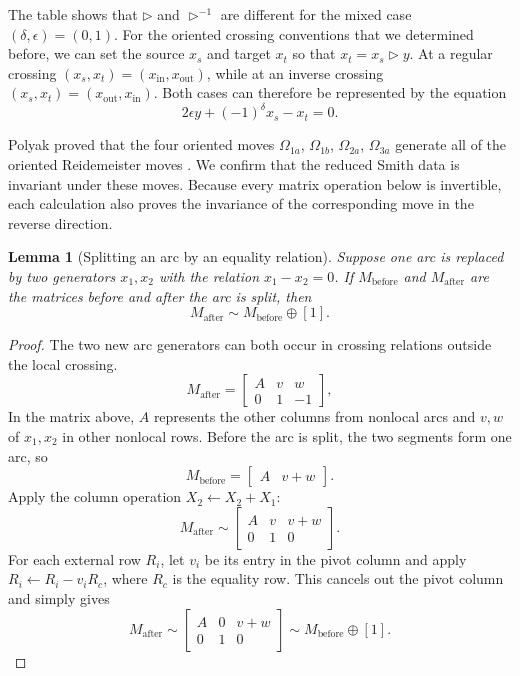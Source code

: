 \documentclass[11pt]{article}
\newtheorem{lemma}[theorem]{Lemma}
\theoremstyle{definition}
\begin{document}
The table shows that $\triangleright$ and $\triangleright^{-1}$ are different for the mixed case $(\delta,\epsilon)=(0,1)$. For the oriented crossing conventions that we determined before, we can set the source $x_s$ and target $x_t$ so that $x_t=x_s\triangleright y$. At a regular crossing $(x_s,x_t)=(x_{\mathrm{in}},x_{\mathrm{out}})$, while at an inverse crossing $(x_s,x_t)=(x_{\mathrm{out}},x_{\mathrm{in}})$. Both cases can therefore be represented by the equation
\begin{equation}
2\epsilon y+(-1)^\delta x_s-x_t=0.
\label{eq:oriented-crossing}
\end{equation}

Polyak proved that the four oriented moves $\Omega_{1a}$, $\Omega_{1b}$, $\Omega_{2a}$, $\Omega_{3a}$ generate all of the oriented Reidemeister moves \cite[Theorem~1.1]{polyak}. We confirm that the reduced Smith data is invariant under these moves. Because every matrix operation below is invertible, each calculation also proves the invariance of the corresponding move in the reverse direction.

\begin{lemma}[Splitting an arc by an equality relation]
Suppose one arc is replaced by two generators $x_1,x_2$ with the relation $x_1-x_2=0$. If $M_{\mathrm{before}}$ and $M_{\mathrm{after}}$ are the matrices before and after the arc is split, then
\[
M_{\mathrm{after}}\sim M_{\mathrm{before}}\oplus[1].
\]
\end{lemma}

\begin{proof}
The two new arc generators can both occur in crossing relations outside the local crossing.
\[
M_{\mathrm{after}}=
\begin{bmatrix}
A&v&w\\
0&1&-1
\end{bmatrix},
\]
In the matrix above, $A$ represents the other columns from nonlocal arcs and $v,w$ of $x_1,x_2$ in other nonlocal rows. Before the arc is split, the two segments form one arc, so
\[
M_{\mathrm{before}}=
\begin{bmatrix}
A&v+w
\end{bmatrix}.
\]
Apply the column operation $X_2\leftarrow X_2+X_1$:
\[
M_{\mathrm{after}}\sim
\begin{bmatrix}
A&v&v+w\\
0&1&0
\end{bmatrix}.
\]
For each external row $R_i$, let $v_i$ be its entry in the pivot column and apply $R_i\leftarrow R_i-v_iR_c$, where $R_c$ is the equality row. This cancels out the pivot column and simply gives
\[
M_{\mathrm{after}}\sim
\begin{bmatrix}
A&0&v+w\\
0&1&0
\end{bmatrix}
\sim M_{\mathrm{before}}\oplus[1].
\]
\end{proof}
\end{document}
